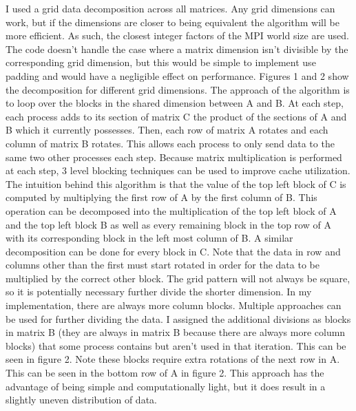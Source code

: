 \documentclass{article}
\begin{document}
I used a grid data decomposition across all matrices. Any grid dimensions can work, but if the
dimensions are closer to being equivalent the algorithm will be more efficient. As such, the closest
integer factors of the MPI world size are used. The code doesn't handle the case where a matrix
dimension isn't divisible by the corresponding grid dimension, but this would be simple to implement
use padding and would have a negligible effect on performance. Figures 1 and 2 show the decomposition
for different grid dimensions. The approach of the algorithm is to loop over the blocks 
in the shared dimension between A and B. At each step, each process adds to its section of matrix C the 
product of the sections of A and B which it currently possesses. Then, each row of matrix A rotates
and each column of matrix B rotates. This allows each process to only send data to the same two other
processes each step. Because matrix multiplication is performed at each step, 3 level blocking techniques
can be used to improve cache utilization. The intuition behind this algorithm is that the value of the top
left block of C is computed by multiplying the first row of A by the first column of B. This operation can
be decomposed into the multiplication of the top left block of A and the top left block B as well as 
every remaining block in the top row of A with its corresponding block in the left most column of B.
A similar decomposition can be done for every block in C. Note that the data in row and columns other than the 
first must start rotated in order for the data to be multiplied by the correct other block. The grid
pattern will not always be square, so it is potentially necessary further divide the shorter dimension.
In my implementation, there are always more column blocks. Multiple approaches can be used for further 
dividing the data. I assigned the additional  divisions as blocks in matrix B (they are always in matrix B
because there are always more column blocks) that some process contains but aren't used
in that iteration. This can be seen in figure 2. Note these blocks require extra rotations of the next
row in A. This can be seen in the bottom row of A in figure 2. This approach has the advantage of being
simple and computationally light, but it does result in a slightly uneven distribution of data. 
\end{document}

